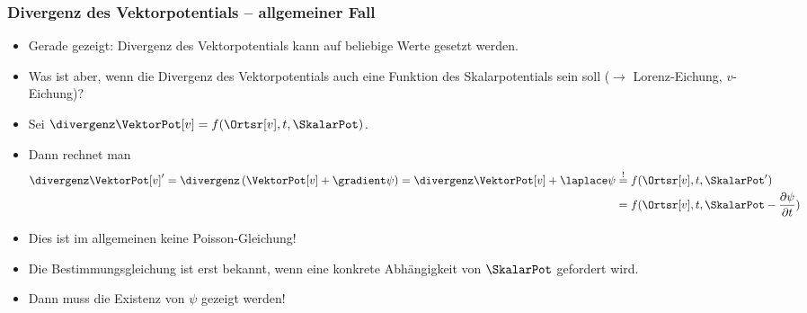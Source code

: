   \begin{frame}
  \frametitle{Divergenz des Vektorpotentials -- allgemeiner Fall}
  \begin{itemize}[<+->]
  \item Gerade gezeigt: Divergenz des Vektorpotentials kann auf beliebige Werte gesetzt werden.
  \item Was ist aber, wenn die Divergenz des Vektorpotentials auch eine \alert{Funktion des Skalarpotentials} sein soll ($\to$ Lorenz-Eichung, $v$-Eichung)?
  \item Sei $\divergenz \VektorPot[v] = f(\Ortsr[v], t, \SkalarPot)$.
  \item Dann rechnet man
    \begin{equation}
      \begin{aligned}
        \divergenz \VektorPot[v]^\prime = \divergenz\left( \VektorPot[v] +\gradient\psi\right) = \divergenz \VektorPot[v] +\laplace\psi &\stackrel{!}{=} f(\Ortsr[v], t, \SkalarPot^\prime)  \\
        &=f(\Ortsr[v], t, \SkalarPot-\frac{\partial \psi}{\partial t})
        \end{aligned}
      \end{equation}
    \item Dies ist im allgemeinen keine Poisson-Gleichung!
    \item Die Bestimmungsgleichung ist erst bekannt, wenn eine konkrete Abhängigkeit von $\SkalarPot$ gefordert wird.
      \item Dann muss die Existenz von $\psi$ gezeigt werden!
  \end{itemize}
  \end{frame}


